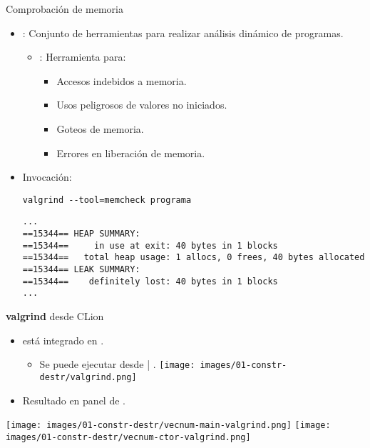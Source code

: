 \begin{frame}[fragile]{Comprobación de memoria}
\begin{itemize}
  \item {}: 
        Conjunto de herramientas para realizar análisis dinámico de programas.
    \begin{itemize}
      \item {}: Herramienta para:
        \begin{itemize}
          \item Accesos indebidos a memoria.
          \item Usos peligrosos de valores no iniciados.
          \item Goteos de memoria.
          \item Errores en liberación de memoria.
        \end{itemize}
    \end{itemize}
  \item Invocación:
\begin{lstlisting}[style=terminal]
valgrind --tool=memcheck programa
\end{lstlisting}
\begin{lstlisting}[style=terminal]
...
==15344== HEAP SUMMARY:
==15344==     in use at exit: 40 bytes in 1 blocks
==15344==   total heap usage: 1 allocs, 0 frees, 40 bytes allocated
==15344== LEAK SUMMARY:
==15344==    definitely lost: 40 bytes in 1 blocks
...
\end{lstlisting}
\end{itemize}
\end{frame}

\begin{frame}[t]{\textbf{valgrind} desde CLion}
\begin{itemize}
  \item {} está integrado en .
    \begin{itemize}
      \item Se puede ejecutar desde  | .
      \texttt{[image: images/01-constr-destr/valgrind.png]}
    \end{itemize}
  \item Resultado en panel de .
\end{itemize}
\texttt{[image: images/01-constr-destr/vecnum-main-valgrind.png]}
\texttt{[image: images/01-constr-destr/vecnum-ctor-valgrind.png]}
\end{frame}

